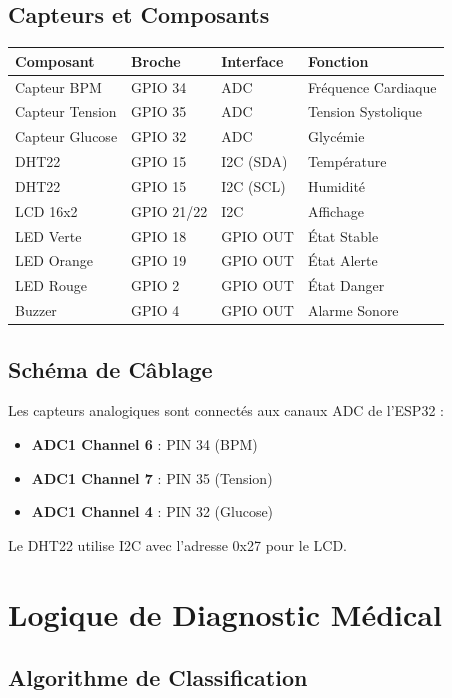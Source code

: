 \documentclass[12pt,french]{report}
\begin{document}
\subsection{Capteurs et Composants}

\begin{table}[h]
\centering
\begin{tabular}{|l|l|l|l|}
\hline
\textbf{Composant} & \textbf{Broche} & \textbf{Interface} & \textbf{Fonction} \\
\hline
Capteur BPM & GPIO 34 & ADC & Fréquence Cardiaque \\
Capteur Tension & GPIO 35 & ADC & Tension Systolique \\
Capteur Glucose & GPIO 32 & ADC & Glycémie \\
DHT22 & GPIO 15 & I2C (SDA) & Température \\
DHT22 & GPIO 15 & I2C (SCL) & Humidité \\
LCD 16x2 & GPIO 21/22 & I2C & Affichage \\
LED Verte & GPIO 18 & GPIO OUT & État Stable \\
LED Orange & GPIO 19 & GPIO OUT & État Alerte \\
LED Rouge & GPIO 2 & GPIO OUT & État Danger \\
Buzzer & GPIO 4 & GPIO OUT & Alarme Sonore \\
\hline
\end{tabular}
\end{table}

\subsection{Schéma de Câblage}

Les capteurs analogiques sont connectés aux canaux ADC de l'ESP32 :
\begin{itemize}
    \item \textbf{ADC1 Channel 6} : PIN 34 (BPM)
    \item \textbf{ADC1 Channel 7} : PIN 35 (Tension)
    \item \textbf{ADC1 Channel 4} : PIN 32 (Glucose)
\end{itemize}

Le DHT22 utilise I2C avec l'adresse 0x27 pour le LCD.

\section{Logique de Diagnostic Médical}

\subsection{Algorithme de Classification}
\end{document}
